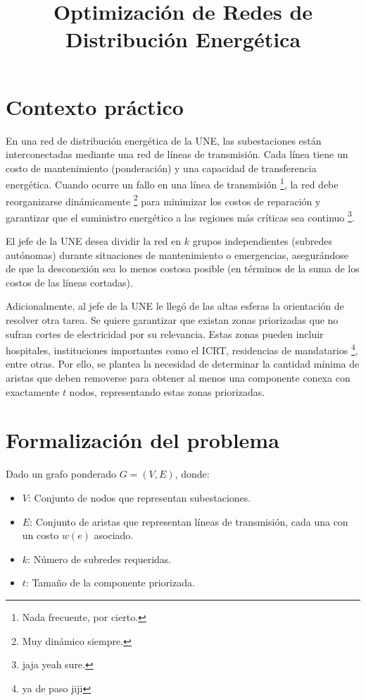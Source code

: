 \documentclass[a4paper, 12pt]{article}
\title{\textbf{Optimización de Redes de Distribución Energética}}
\author{}
\date{}
\begin{document}
\maketitle

\section*{Contexto práctico}
En una red de distribución energética de la UNE, 
las subestaciones están interconectadas mediante 
una red de líneas de transmisión. Cada línea tiene 
un costo de mantenimiento (ponderación) y una 
capacidad de transferencia energética. 
Cuando ocurre un fallo en una línea de transmisión 
\footnote{Nada frecuente, por cierto.}, 
la red debe reorganizarse dinámicamente \footnote{Muy dinámico siempre.} 
para minimizar los costos de reparación y garantizar 
que el suministro energético a las regiones más 
críticas sea continuo \footnote{jaja yeah sure.}.

El jefe de la UNE desea dividir la red en \( k \) 
grupos independientes (subredes autónomas) durante 
situaciones de mantenimiento o emergencias, 
asegurándose de que la desconexión sea lo menos 
costosa posible (en términos de la suma de los 
costos de las líneas cortadas).

Adicionalmente, al jefe de la UNE le llegó de las altas esferas
la orientación de resolver otra tarea. 
Se quiere garantizar que existan zonas priorizadas que 
no sufran cortes de electricidad por su relevancia. 
Estas zonas pueden incluir hospitales, instituciones importantes como el ICRT, 
residencias de mandatarios \footnote{ya de paso jiji}, entre otras. 
Por ello, se plantea la necesidad de determinar la 
cantidad mínima de aristas que deben removerse para 
obtener al menos una componente conexa con 
exactamente \( t \) nodos, representando estas zonas 
priorizadas.

\section*{Formalización del problema}
Dado un grafo ponderado \( G = (V, E) \), donde:
\begin{itemize}
    \item \( V \): Conjunto de nodos que representan subestaciones.
    \item \( E \): Conjunto de aristas que representan líneas de transmisión, cada una con un costo \( w(e) \) asociado.
    \item \( k \): Número de subredes requeridas.
    \item \( t \): Tamaño de la componente priorizada.
\end{itemize}
\end{document}
